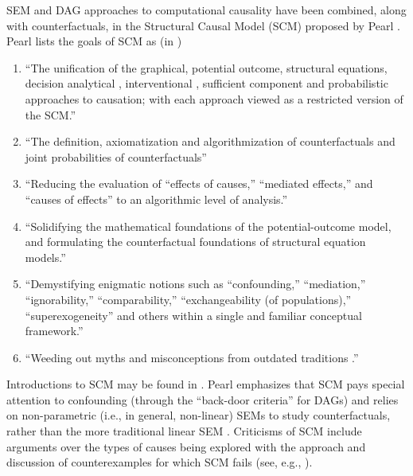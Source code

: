 \documentclass{article}[10pt]
\begin{document}
SEM and DAG approaches to computational causality have been combined, along with counterfactuals, in the Structural Causal Model (SCM) proposed by Pearl \cite{Pearl2000,Pearl2009}.  Pearl lists the goals of SCM as (in \cite{Pearl2009})
\begin{enumerate}
\item ``The unification of the graphical, potential outcome, structural equations, decision analytical \cite{Dawid2002}, interventional \cite{Woodward2003}, sufficient component \cite{Rothman1976} and probabilistic \cite{Suppes1970} approaches to causation; with each approach viewed as a restricted version of the SCM.''
\item ``The definition, axiomatization and algorithmization of counterfactuals and joint probabilities of counterfactuals''
\item ``Reducing the evaluation of “effects of causes,” “mediated effects,” and “causes of effects” to an algorithmic level of analysis.''
\item ``Solidifying the mathematical foundations of the potential-outcome model, and formulating the counterfactual foundations of structural equation models.''
\item ``Demystifying enigmatic notions such as “confounding,” “mediation,” “ignorability,” “comparability,” “exchangeability (of populations),” “superexogeneity” and others within a single and familiar conceptual framework.''
\item ``Weeding out myths and misconceptions from outdated traditions \cite{Meek1994,Greenland1999,Cole2002,Arah2008,Shrier2009,Pearl2009l}.''
\end{enumerate}
Introductions to SCM may be found in \cite{Pearl2009,Pearl2000}.  Pearl emphasizes that SCM pays special attention to confounding (through the ``back-door criteria'' for DAGs) and relies on non-parametric (i.e., in general, non-linear) SEMs to study counterfactuals, rather than the more traditional linear SEM \cite{Pearl2009}.  Criticisms of SCM include arguments over the types of causes being explored with the approach and discussion of counterexamples for which SCM fails (see, e.g., \cite{Hall2007,Glymour2010,Menzies2004}).
\end{document}
